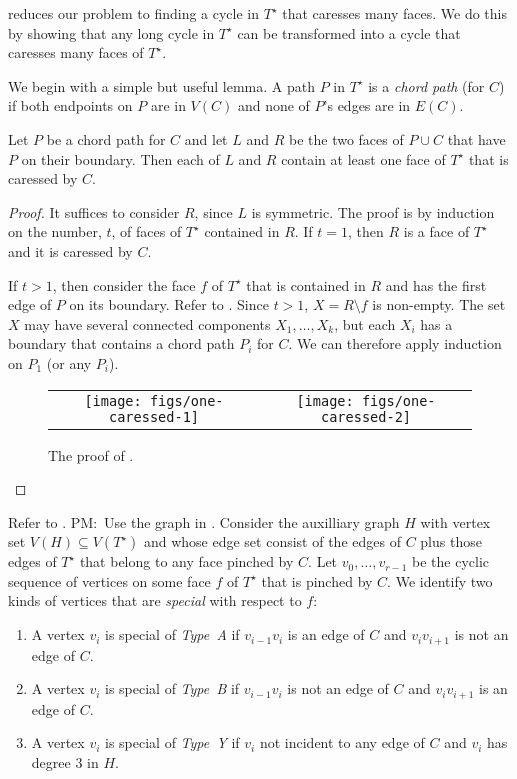 \documentclass{patmorin}
\newcommand{\dual}[1]{{#1}^\star}
\newcommand{\note}[2]{{\color{red}#1:~#2}}
\begin{document}
 reduces our problem to finding a cycle in
$\dual{T}$ that caresses many faces.  We do this by showing that any
long cycle in $\dual{T}$ can be transformed into a cycle that caresses
many faces of $\dual{T}$.  

We begin with a simple but useful lemma.  A path $P$ in $\dual{T}$ is
a \emph{chord path} (for $C$) if both endpoints on $P$ are in $V(C)$
and none of $P$'s edges are in $E(C)$.

\begin{lem}
   Let $P$ be a chord path for $C$ and let $L$ and $R$ be the two faces
   of $P\cup C$ that have $P$ on their boundary. Then each of $L$ and $R$
   contain at least one face of $\dual{T}$ that is caressed by $C$.
\end{lem}

\begin{proof}
   It suffices to consider $R$, since $L$ is symmetric.  The proof is by
   induction on the number, $t$, of faces of $\dual{T}$ contained in $R$.
   If $t=1$, then $R$ is a face of $\dual{T}$ and it is caressed by $C$.

   If $t>1$, then consider the face $f$ of $\dual{T}$ that is contained
	in $R$ and has the first edge of $P$ on its boundary.  Refer to . Since $t>1$,
   $X=R\setminus f$ is non-empty. The set $X$ may have several connected
   components $X_1,\ldots,X_k$, but each $X_i$ has a boundary that contains a chord path $P_i$ for $C$.
	We can therefore apply induction on $P_1$ (or any $P_i$).
  \begin{figure}
     \begin{center}
	\begin{tabular}{cc}
		\texttt{[image: figs/one-caressed-1]} &
		\texttt{[image: figs/one-caressed-2]}
	\end{tabular}
     \end{center}
	  \caption{The proof of .}
  \end{figure}
\end{proof}

Refer to . \note{PM}{Use the graph in \figref{touched-pinched-caressed instead}.}
Consider the auxilliary
graph $H$ with vertex set $V(H)\subseteq V(\dual{T})$ and whose edge set
consist of the edges of $C$ plus those edges of $\dual{T}$ that belong
to any face pinched by $C$. Let $v_0,\ldots,v_{r-1}$ be the cyclic sequence of vertices on some face $f$ of $\dual{T}$ that is pinched by $C$.  
We identify two kinds of vertices that are \emph{special} with respect to $f$:
\begin{enumerate}
  \item A vertex $v_i$ is special of \emph{Type~A} if $v_{i-1}v_i$ is an edge of $C$ and $v_iv_{i+1}$ is not an edge of $C$.
  \item A vertex $v_i$ is special of \emph{Type~B} if $v_{i-1}v_i$ is not an edge of $C$ and $v_iv_{i+1}$ is an edge of $C$.
  \item A vertex $v_i$ is special of \emph{Type~Y} if $v_i$ not incident to any edge of $C$ and $v_i$ has degree 3 in $H$.
\end{enumerate}
\end{document}
